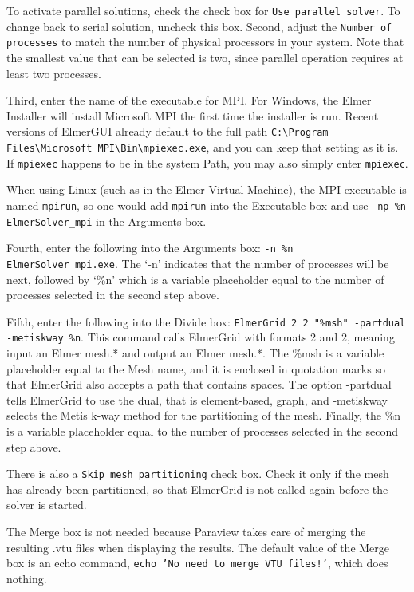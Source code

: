 To activate parallel solutions, check the check box for \texttt{Use parallel solver}.  To change back to serial solution, uncheck this box.  Second, adjust the \texttt{Number of processes} to match the number of physical processors in your system.  Note that the smallest value that can be selected is two, since parallel operation requires at least two processes.

Third, enter the name of the executable for MPI.  For Windows, the Elmer Installer will install Microsoft MPI the first time the installer is run.  Recent versions of ElmerGUI already default to the full path \texttt{C:\textbackslash{}Program Files\textbackslash{}Microsoft MPI\textbackslash{}Bin\textbackslash{}mpiexec.exe}, and you can keep that setting as it is.  If \texttt{mpiexec} happens to be in the system Path, you may also simply enter \texttt{mpiexec}.

When using Linux (such as in the Elmer Virtual Machine), the MPI executable is named \texttt{mpirun}, so one would add \texttt{mpirun} into the Executable box and use \texttt{-np \%{}n ElmerSolver\_mpi} in the Arguments box.

Fourth, enter the following into the Arguments box: \texttt{-n \%{}n ElmerSolver\_{}mpi.exe}.  
\texttt{}
The `-n' indicates that the number of processes will be next, followed by `\%{}n' which is a variable placeholder equal to the number of processes selected in the second step above.

Fifth, enter the following into the Divide box: \texttt{ElmerGrid 2 2 "\%msh" -partdual -metiskway \%n}.  This command calls ElmerGrid with formats 2 and 2, meaning input an Elmer mesh.* and output an Elmer mesh.*.  The \%msh is a variable placeholder equal to the Mesh name, and it is enclosed in quotation marks so that ElmerGrid also accepts a path that contains spaces.  The option -partdual tells ElmerGrid to use the dual, that is element-based, graph, and -metiskway selects the Metis k-way method for the partitioning of the mesh.  Finally, the \%n is a variable placeholder equal to the number of processes selected in the second step above.

There is also a \texttt{Skip mesh partitioning} check box.  Check it only if the mesh has already been partitioned, so that ElmerGrid is not called again before the solver is started.

The Merge box is not needed because Paraview takes care of merging the resulting .vtu files when displaying the results.  The default value of the Merge box is an echo command, \texttt{echo 'No need to merge VTU files!'}, which does nothing.

